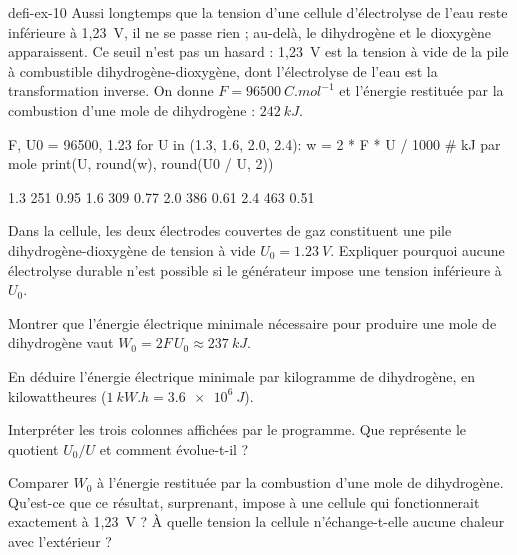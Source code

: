 \begin{blocEdition}{defi-ex-10}
Aussi longtemps que la tension d'une cellule d'électrolyse de l'eau reste inférieure à 1,23~V, il ne se passe rien ;
au-delà, le dihydrogène et le dioxygène apparaissent. Ce seuil n'est pas un hasard : 1,23~V est la tension à vide de la
pile à combustible dihydrogène-dioxygène, dont l'électrolyse de l'eau est la transformation inverse. On donne
$F=\qty{96500}{C.mol^{-1}}$ et l'énergie restituée par la combustion d'une mole de dihydrogène : $\qty{242}{kJ}$.
\begin{codecote}[0.6]
\begin{pythoncol}
F, U0 = 96500, 1.23
for U in (1.3, 1.6, 2.0, 2.4):
    w = 2 * F * U / 1000   # kJ par mole
    print(U, round(w), round(U0 / U, 2))
\end{pythoncol}
\cote
\begin{consolecol}
1.3 251 0.95
1.6 309 0.77
2.0 386 0.61
2.4 463 0.51
\end{consolecol}
\end{codecote}
\begin{questions}
\item Dans la cellule, les deux électrodes couvertes de gaz constituent une pile dihydrogène-dioxygène de tension à
vide $U_0=\qty{1,23}{V}$. Expliquer pourquoi aucune électrolyse durable n'est possible si le générateur impose une
tension inférieure à $U_0$.
\item Montrer que l'énergie électrique minimale nécessaire pour produire une mole de dihydrogène vaut
$W_0=2F\,U_0\approx\qty{237}{kJ}$.
\item En déduire l'énergie électrique minimale par kilogramme de dihydrogène, en kilowattheures
($\qty{1}{kW.h}=\qty{3,6e6}{J}$).
\item Interpréter les trois colonnes affichées par le programme. Que représente le quotient $U_0/U$ et comment
évolue-t-il ?
\item Comparer $W_0$ à l'énergie restituée par la combustion d'une mole de dihydrogène. Qu'est-ce que ce résultat,
surprenant, impose à une cellule qui fonctionnerait exactement à 1,23~V ? À quelle tension la cellule n'échange-t-elle
aucune chaleur avec l'extérieur ?
\end{questions}
\end{blocEdition}

